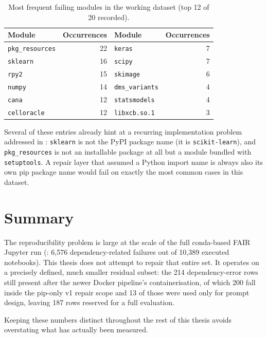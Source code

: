 \begin{table}[h]
  \centering
  \begin{tabular}{|l|r||l|r|}
    \hline
    \textbf{Module} & \textbf{Occurrences} & \textbf{Module} & \textbf{Occurrences} \\
    \hline
    \texttt{pkg\_resources} & 22 & \texttt{keras} & 7 \\
    \hline
    \texttt{sklearn} & 16 & \texttt{scipy} & 7 \\
    \hline
    \texttt{rpy2} & 15 & \texttt{skimage} & 6 \\
    \hline
    \texttt{numpy} & 14 & \texttt{dms\_variants} & 4 \\
    \hline
    \texttt{cana} & 12 & \texttt{statsmodels} & 4 \\
    \hline
    \texttt{celloracle} & 12 & \texttt{libxcb.so.1} & 3 \\
    \hline
  \end{tabular}
  \caption{Most frequent failing modules in the working dataset (top 12 of 20 recorded).}
  \label{tab:pd-top-modules}
\end{table}

Several of these entries already hint at a recurring implementation problem
addressed in : \texttt{sklearn} is not the PyPI
package name (it is \texttt{scikit-learn}), and \texttt{pkg\_resources} is
not an installable package at all but a module bundled with
\texttt{setuptools}. A repair layer that assumed a Python import name is
always also its own pip package name would fail on exactly the most common
cases in this dataset.

\section{Summary}
\label{sec:pd-summary}

The reproducibility problem is large at the scale of the full conda-based
FAIR Jupyter run (: 6,576 dependency-related failures out of
10,389 executed notebooks). This thesis does not attempt to repair that
entire set. It operates on a precisely defined, much smaller residual
subset: the 214 dependency-error rows still present after the newer Docker
pipeline's containerisation, of which 200 fall inside the pip-only v1 repair
scope and 13 of those were used only for prompt design, leaving 187 rows
reserved for a full evaluation.


Keeping these numbers
distinct throughout the rest of this thesis avoids overstating what has
actually been measured.
